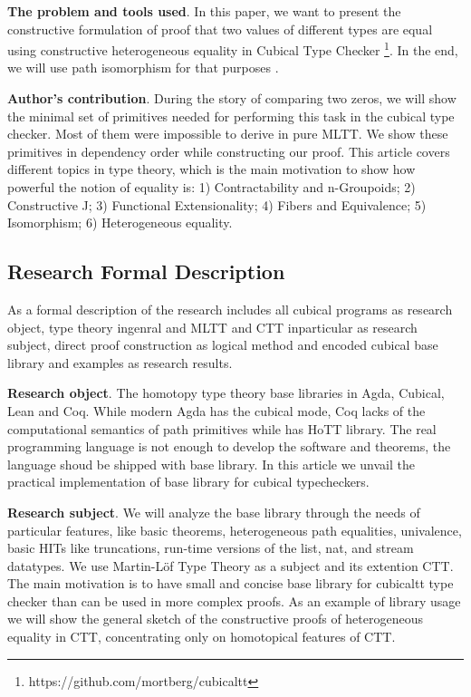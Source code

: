 \documentclass{article}
\begin{document}
{\bf The problem and tools used}. In this paper, we want to present the constructive formulation of proof
that two values of different types are equal using constructive heterogeneous equality
in Cubical Type Checker \cite{Mortberg17} \footnote{https://github.com/mortberg/cubicaltt}.
In the end, we will use path isomorphism for that purposes \cite{HoTT}.

{\bf Author's contribution}. During the story of comparing two zeros,
we will show the minimal set of primitives needed
for performing this task in the cubical type checker. Most of
them were impossible to derive in pure MLTT. We show these primitives in dependency order
while constructing our proof. This article covers different topics in type theory,
which is the main motivation to show how powerful the notion of equality is:
1) Contractability and n-Groupoids;
2) Constructive J;
3) Functional Extensionality;
4) Fibers and Equivalence;
5) Isomorphism;
6) Heterogeneous equality.

\subsection{Research Formal Description}

As a formal description of the research includes all cubical programs as research object,
type theory ingenral and MLTT and CTT inparticular as research subject,
direct proof construction as logical method and encoded cubical
base library and examples as research results.

{\bf Research object}. The homotopy type theory base libraries in Agda, Cubical, Lean and Coq.
While modern Agda has the cubical mode, Coq lacks of the computational semantics of path primitives
while has HoTT library. The real programming language is not enough to
develop the software and theorems, the language shoud be shipped with base library. In this article
we unvail the practical implementation of base library for cubical typecheckers.

{\bf Research subject}. We will analyze the base library through the needs of particular features,
like basic theorems, heterogeneous path equalities, univalence, basic HITs like truncations, run-time
versions of the list, nat, and stream datatypes. We use Martin-Löf Type Theory as a subject and
its extention CTT. The main motivation is to have small and concise base library for cubicaltt
type checker than can be used in more complex proofs. As an example of library usage we will show
the general sketch of the constructive proofs of heterogeneous equality in CTT, concentrating only
on homotopical features of CTT.
\end{document}
